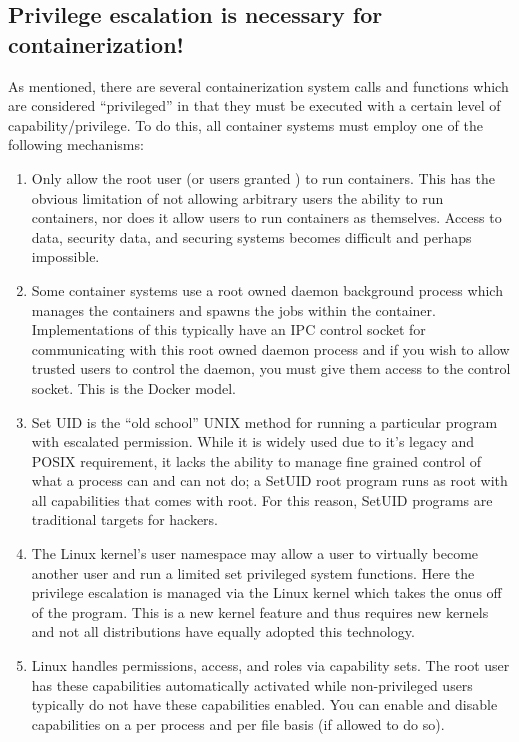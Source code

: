 \documentclass[letterpaper,10pt,english]{sphinxmanual}
\begin{document}
\subsection{Privilege escalation is necessary for containerization!}
\label{\detokenize{security:privilege-escalation-is-necessary-for-containerization}}
As mentioned, there are several containerization system calls and
functions which are considered “privileged” in that they must be
executed with a certain level of capability/privilege. To do this, all
container systems must employ one of the following mechanisms:
\begin{enumerate}
\item {} 
 Only allow the root user (or users granted )
to run containers. This has the obvious limitation of not allowing
arbitrary users the ability to run containers, nor does it allow
users to run containers as themselves. Access to data, security data,
and securing systems becomes difficult and perhaps impossible.

\item {} 
 Some container systems use a root
owned daemon background process which manages the containers and
spawns the jobs within the container. Implementations of this
typically have an IPC control socket for communicating with this root
owned daemon process and if you wish to allow trusted users to
control the daemon, you must give them access to the control socket.
This is the Docker model.

\item {} 
 Set UID is the “old school” UNIX method for running a
particular program with escalated permission. While it is widely used
due to it’s legacy and POSIX requirement, it lacks the ability to
manage fine grained control of what a process can and can not do; a
SetUID root program runs as root with all capabilities that comes
with root. For this reason, SetUID programs are traditional targets
for hackers.

\item {} 
 The Linux kernel’s user namespace may allow a
user to virtually become another user and run a limited set
privileged system functions. Here the privilege escalation is managed
via the Linux kernel which takes the onus off of the program. This is
a new kernel feature and thus requires new kernels and not all
distributions have equally adopted this technology.

\item {} 
 Linux handles permissions, access, and roles via
capability sets. The root user has these capabilities automatically
activated while non-privileged users typically do not have these
capabilities enabled. You can enable and disable capabilities on a
per process and per file basis (if allowed to do so).

\end{enumerate}
\end{document}
